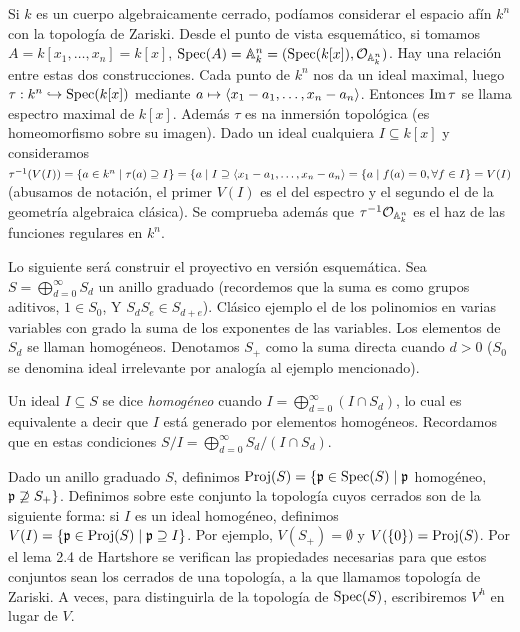 \documentclass[GA.tex]{subfiles}
\begin{document}
\begin{ej}
Si $k$ es un cuerpo algebraicamente cerrado, podíamos considerar el espacio afín $k^n$ con la topología de Zariski. Desde el punto de vista esquemático, si tomamos $A=k[x_1,\dots, x_n]=k[x]$, $\operatorname{Spec}(A)=\mathbb{A}_k^n=(\operatorname{Spec}(k[x]),{\mathcal O}_{\mathbb{A}_k^n})$. Hay una relación entre estas dos construcciones. Cada punto de $k^n$ nos da un ideal maximal, luego $\tau:k^n\hookrightarrow\operatorname{Spec}(k[x])$ mediante $a\mapsto \langle{x_1-a_1, \dots, x_n-a_n}\rangle$. Entonces $\operatorname{Im}\tau$ se llama espectro maximal de $k[x]$. Además $\tau$ es na inmersión topológica (es homeomorfismo sobre su imagen). Dado un ideal cualquiera $I\subseteq k[x]$ y consideramos $\tau^{-1}(V(I))=\{a\in k^n\mid \tau(a)\supseteq I\}=\{a\mid I\supseteq \langle{x_1-a_1, \dots, x_n-a_n}\rangle=\{a\mid f(a)=0, \forall f\in I\}=V(I)$ (abusamos de notación, el primer $V(I)$ es el del espectro y el segundo el de la geometría algebraica clásica). Se comprueba además que $\tau^{-1}{\mathcal O}_{\mathbb{A}_k^n}$ es el haz de las funciones regulares en $k^n$. 
\end{ej}

Lo siguiente será construir el proyectivo en versión esquemática. Sea $S=\bigoplus_{d=0}^{\infty}S_d$ un anillo graduado (recordemos que la suma es como grupos aditivos, $1\in S_0$, Y $S_dS_e\in S_{d+e}$). Clásico ejemplo el de los polinomios en varias variables con grado la suma de los exponentes de las variables. Los elementos de $S_d$ se llaman homogéneos. Denotamos $S_+$ como la suma directa cuando $d>0$ ($S_0$ se denomina ideal irrelevante por analogía al ejemplo mencionado). 

\begin{defi}
Un ideal $I\subseteq S$ se dice \emph{homogéneo} cuando $I=\bigoplus_{d=0}^{\infty}(I\cap S_d)$, lo cual es equivalente a decir que $I$ está generado por elementos homogéneos. Recordamos que en estas condiciones $S/I=\bigoplus_{d=0}^{\infty}S_d/(I\cap S_d)$.
\end{defi} 

Dado un anillo graduado $S$, definimos $\operatorname{Proj}(S)=\{{\mathfrak{p}}\in\operatorname{Spec}(S)\mid {\mathfrak{p}}$ homogéneo, ${\mathfrak{p}}\not\supseteq S_+\}$. Definimos sobre este conjunto la topología cuyos cerrados son de la siguiente forma: si $I$ es un ideal homogéneo, definimos $V(I)=\{{\mathfrak{p}}\in\operatorname{Proj}(S)\mid {\mathfrak{p}}\supseteq I\}$. Por ejemplo, $V(S_+)=\emptyset$ y $V(\{0\})=\operatorname{Proj}(S)$. Por el lema 2.4 de Hartshore se verifican las propiedades necesarias para que estos conjuntos sean los cerrados de una topología, a la que llamamos topología de Zariski. A veces, para distinguirla de la topología de $\operatorname{Spec}(S)$, escribiremos $V^h$ en lugar de $V$.
\end{document}

